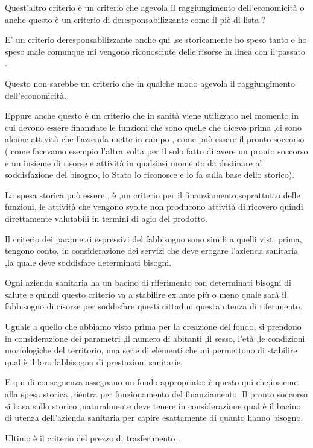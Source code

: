 Quest'altro criterio è un criterio che agevola il raggiungimento
dell'economicità o anche questo è un criterio di deresponsabilizzante
come il piè di lista ?

E' un criterio deresponsabilizzante anche qui ,se storicamente ho speso
tanto e ho speso male comunque mi vengono riconosciute delle risorse in
linea con il passato .

Questo non sarebbe un criterio che in qualche modo agevola il
raggiungimento dell'economicità.

Eppure anche questo è un criterio che in sanità viene utilizzato nel
momento in cui devono essere finanziate le funzioni che sono quelle che
dicevo prima ,ci sono alcune attività che l'azienda mette in campo ,
come può essere il pronto soccorso ( come facevamo esempio l'altra volta
per il solo fatto di avere un pronto soccorso e un insieme di risorse e
attività in qualsiasi momento da destinare al soddisfazione del bisogno,
lo Stato lo riconosce e lo fa sulla base dello storico).

La spesa storica può essere , è ,un criterio per il
finanziamento,soprattutto delle funzioni, le attività che vengono svolte
non producono attività di ricovero quindi direttamente valutabili in
termini di agio del prodotto.

Il criterio dei parametri espressivi del fabbisogno sono simili a quelli
visti prima, tengono conto, in considerazione dei servizi che deve
erogare l'azienda sanitaria ,la quale deve soddisfare determinati
bisogni.

Ogni azienda sanitaria ha un bacino di riferimento con determinati
bisogni di salute e quindi questo criterio va a stabilire ex ante più o
meno quale sarà il fabbisogno di risorse per soddisfare questi cittadini
questa utenza di riferimento.

Uguale a quello che abbiamo visto prima per la creazione del fondo, si
prendono in considerazione dei parametri ,il numero di abitanti ,il
sesso, l'età ,le condizioni morfologiche del territorio, una serie di
elementi che mi permettono di stabilire qual è il loro fabbisogno di
prestazioni sanitarie.

E qui di conseguenza assegnano un fondo appropriato: è questo qui
che,insieme alla spesa storica ,rientra per funzionamento del
finanziamento. Il pronto soccorso si basa sullo storico ,naturalmente
deve tenere in considerazione qual è il bacino di utenza dell'azienda
sanitaria per capire esattamente di quanto hanno bisogno.

Ultimo è il criterio del prezzo di trasferimento .

